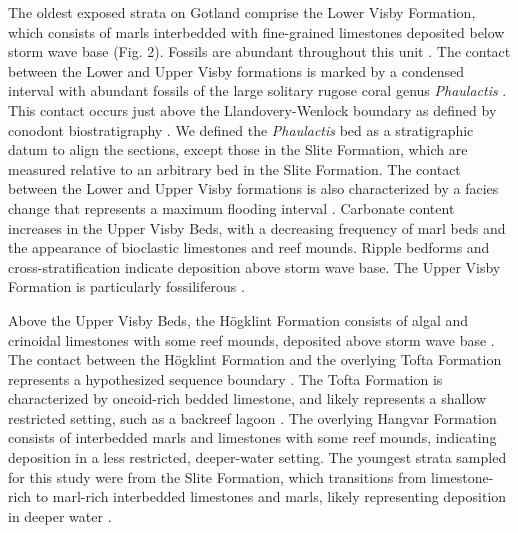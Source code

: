 \documentclass[preprint, authoryear]{elsarticle}
\begin{document}
The oldest exposed strata on Gotland comprise the Lower Visby Formation, which consists of marls interbedded with fine-grained limestones deposited below storm wave base (Fig. 2). Fossils are abundant throughout this unit \citep{Calner2004a, Samtleben1996}. The contact between the Lower and Upper Visby formations is marked by a condensed interval with abundant fossils of the large solitary rugose coral genus \textit{Phaulactis} \citep{Jeppsson1997, Jeppsson2006, Munnecke2003, Samtleben1996}. This contact occurs just above the Llandovery-Wenlock boundary as defined by conodont biostratigraphy \citep{Aldridge1993, Jeppsson1983, Mabillard1985}. We defined the \textit{Phaulactis} bed as a stratigraphic datum to align the sections, except those in the Slite Formation, which are measured relative to an arbitrary bed in the Slite Formation. The contact between the Lower and Upper Visby formations is also characterized by a facies change that represents a maximum flooding interval \citep{Calner2004b}. Carbonate content increases in the Upper Visby Beds, with a decreasing frequency of marl beds and the appearance of bioclastic limestones and reef mounds. Ripple bedforms and cross-stratification indicate deposition above storm wave base. The Upper Visby Formation is particularly fossiliferous \citep{Calner2004a, Samtleben1996}. 

Above the Upper Visby Beds, the H\"{o}gklint Formation consists of algal and crinoidal limestones with some reef mounds, deposited above storm wave base \citep{Riding1991, Samtleben1996, Watts2000}. The contact between the H\"{o}gklint Formation and the overlying Tofta Formation represents a hypothesized sequence boundary \citep{Calner2004b}. The Tofta Formation is characterized by oncoid-rich bedded limestone, and likely represents a shallow restricted setting, such as a backreef lagoon \citep{Riding1991, Samtleben1996}. The overlying Hangvar Formation consists of interbedded marls and limestones with some reef mounds, indicating deposition in a less restricted, deeper-water setting. The youngest strata sampled for this study were from the Slite Formation, which transitions from limestone-rich to marl-rich interbedded limestones and marls, likely representing deposition in deeper water \citep{Calner2004a}. 
\end{document}

